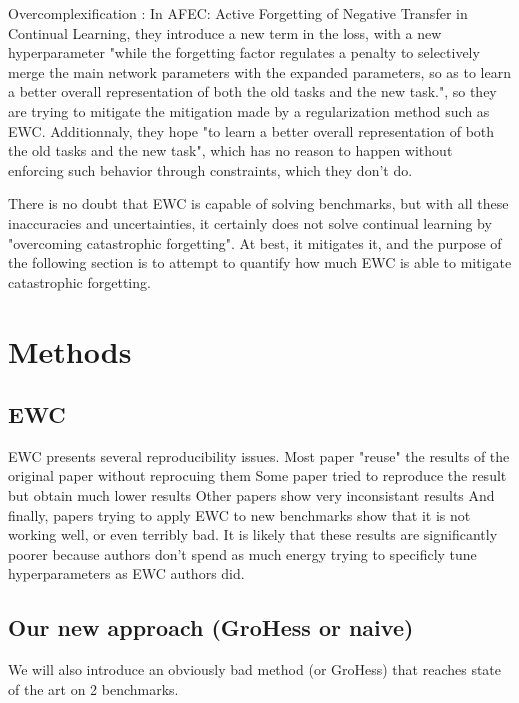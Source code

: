 \documentclass[twocolumn]{article}
\begin{document}
\vspace{1mm}
\noindent
Overcomplexification : In AFEC: Active Forgetting of Negative Transfer in Continual Learning, they introduce a new term in the loss, with a new hyperparameter "while the forgetting factor regulates a penalty to selectively merge the main network parameters with the expanded parameters, so as to learn a better overall representation of both the old tasks and the new task.", so they are trying to mitigate the mitigation made by a regularization method such as EWC. Additionnaly, they hope "to learn a better overall representation of both the old tasks and the new task", which has no reason to happen without enforcing such behavior through constraints, which they don't do.

There is no doubt that EWC is capable of solving benchmarks, but with all these inaccuracies and uncertainties, it certainly does not solve continual learning by "overcoming catastrophic forgetting". At best, it mitigates it, and the purpose of the following section is to attempt to quantify how much EWC is able to mitigate catastrophic forgetting.



\section{Methods}



\subsection{EWC}

EWC presents several reproducibility issues.
Most paper "reuse" the results of the original paper without reprocuing them
Some paper tried to reproduce the result but obtain much lower results
Other papers show very inconsistant results
And finally, papers trying to apply EWC to new benchmarks show that it is not working well, or even terribly bad. It is likely that these results are significantly poorer because authors don't spend as much energy trying to specificly tune hyperparameters as EWC authors did.


\subsection{Our new approach (GroHess or naive)}

We will also introduce an obviously bad method (or GroHess) that reaches state of the art on 2 benchmarks.
\end{document}
